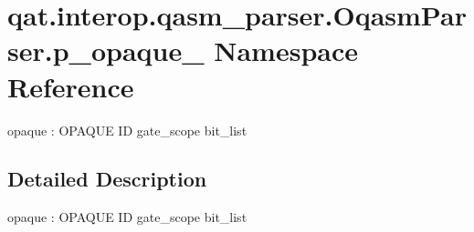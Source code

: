 \hypertarget{namespaceqat_1_1interop_1_1qasm__parser_1_1OqasmParser_1_1p__opaque__0}{\section{qat.\-interop.\-qasm\-\_\-parser.\-Oqasm\-Parser.\-p\-\_\-opaque\-\_ Namespace Reference}
\label{namespaceqat_1_1interop_1_1qasm__parser_1_1OqasmParser_1_1p__opaque__0}
}


opaque \-: O\-P\-A\-Q\-U\-E I\-D gate\-\_\-scope bit\-\_\-list  




\subsection{Detailed Description}
opaque \-: O\-P\-A\-Q\-U\-E I\-D gate\-\_\-scope bit\-\_\-list 